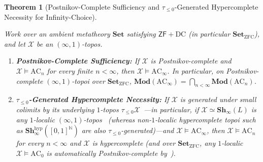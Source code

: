 \documentclass[10pt,twoside,openright]{book}
\theoremstyle{crmplain}
\newtheorem{theorem}{Theorem}[section]
\theoremstyle{crmdef}
\theoremstyle{crmremark}
\begin{document}
\begin{theorem}[Postnikov-Complete Sufficiency and $\tau_{\le 0}$-Generated Hypercomplete Necessity for Infinity-Choice]\label{thm:limit-residuum}%
%

Work over an ambient metatheory $\mathbf{Set}$ satisfying $\mathsf{ZF} + \mathrm{DC}$ (in particular $\mathbf{Set}_{\mathrm{ZFC}}$), and let $\mathcal{X}$ be an $(\infty, 1)$-topos.
\begin{enumerate}[label=\textup{(\roman*)},leftmargin=2.0em]
  \item \textbf{Postnikov-Complete Sufficiency:} If $\mathcal{X}$ is Postnikov-complete and $\mathcal{X} \models \mathrm{AC}_n$ for every finite $n < \infty$, then $\mathcal{X} \models \mathrm{AC}_\infty$. In particular, on Postnikov-complete $(\infty, 1)$-topoi over $\mathbf{Set}_{\mathrm{ZFC}}$, $\mathbf{Mod}(\mathrm{AC}_\infty) = \bigcap_{n < \infty} \mathbf{Mod}(\mathrm{AC}_n)$.
  \item \textbf{$\tau_{\le 0}$-Generated Hypercomplete Necessity:} If $\mathcal{X}$ is generated under small colimits by its underlying $1$-topos $\tau_{\le 0}\mathcal{X}$~\cite[Prop.~5.5.6.28]{Lurie09}---in particular, if $\mathcal{X} \simeq \mathbf{Sh}_\infty(L)$ is any $1$-localic $(\infty, 1)$-topos~\cite[\S 6.4.5]{Lurie09} (whereas non-$1$-localic hypercomplete topoi such as $\mathbf{Sh}_\infty^{\mathrm{hyp}}([0,1]^{\mathbb{N}})$ are also $\tau_{\le 0}$-generated)---and $\mathcal{X} \models \mathrm{AC}_\infty$, then $\mathcal{X} \models \mathrm{AC}_n$ for every $n < \infty$ and $\mathcal{X}$ is hypercomplete (and over $\mathbf{Set}_{\mathrm{ZFC}}$, any $1$-localic $\mathcal{X} \models \mathrm{AC}_0$ is automatically Postnikov-complete by~\cite[Corollary~7.2.1.12]{Lurie09}).
\end{enumerate}

\end{theorem}
\end{document}
